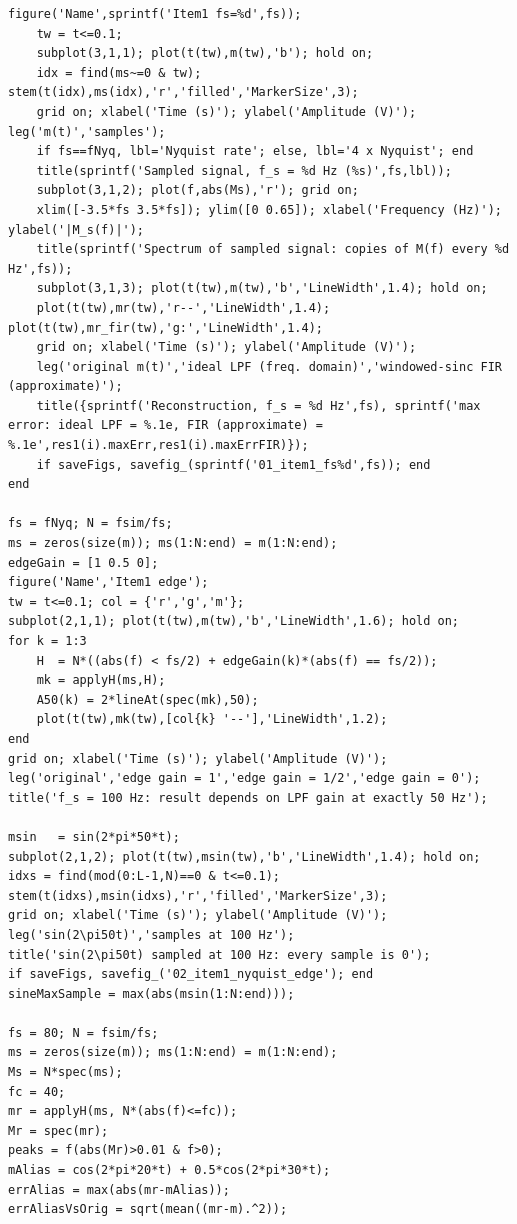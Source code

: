 \documentclass[a4paper]{article}
\begin{document}
\begin{lstlisting}[basicstyle=\ttfamily\scriptsize, breaklines=true, breakatwhitespace=true, frame=single, xleftmargin=6pt, xrightmargin=6pt, framexleftmargin=6pt, framexrightmargin=6pt, aboveskip=4pt, belowskip=6pt]
    figure('Name',sprintf('Item1 fs=%d',fs));
    tw = t<=0.1;
    subplot(3,1,1); plot(t(tw),m(tw),'b'); hold on;
    idx = find(ms~=0 & tw); stem(t(idx),ms(idx),'r','filled','MarkerSize',3);
    grid on; xlabel('Time (s)'); ylabel('Amplitude (V)'); leg('m(t)','samples');
    if fs==fNyq, lbl='Nyquist rate'; else, lbl='4 x Nyquist'; end
    title(sprintf('Sampled signal, f_s = %d Hz (%s)',fs,lbl));
    subplot(3,1,2); plot(f,abs(Ms),'r'); grid on;
    xlim([-3.5*fs 3.5*fs]); ylim([0 0.65]); xlabel('Frequency (Hz)'); ylabel('|M_s(f)|');
    title(sprintf('Spectrum of sampled signal: copies of M(f) every %d Hz',fs));
    subplot(3,1,3); plot(t(tw),m(tw),'b','LineWidth',1.4); hold on;
    plot(t(tw),mr(tw),'r--','LineWidth',1.4); plot(t(tw),mr_fir(tw),'g:','LineWidth',1.4);
    grid on; xlabel('Time (s)'); ylabel('Amplitude (V)');
    leg('original m(t)','ideal LPF (freq. domain)','windowed-sinc FIR (approximate)');
    title({sprintf('Reconstruction, f_s = %d Hz',fs), sprintf('max error: ideal LPF = %.1e, FIR (approximate) = %.1e',res1(i).maxErr,res1(i).maxErrFIR)});
    if saveFigs, savefig_(sprintf('01_item1_fs%d',fs)); end
end

fs = fNyq; N = fsim/fs;
ms = zeros(size(m)); ms(1:N:end) = m(1:N:end);
edgeGain = [1 0.5 0];
figure('Name','Item1 edge');
tw = t<=0.1; col = {'r','g','m'};
subplot(2,1,1); plot(t(tw),m(tw),'b','LineWidth',1.6); hold on;
for k = 1:3
    H  = N*((abs(f) < fs/2) + edgeGain(k)*(abs(f) == fs/2));
    mk = applyH(ms,H);
    A50(k) = 2*lineAt(spec(mk),50);
    plot(t(tw),mk(tw),[col{k} '--'],'LineWidth',1.2);
end
grid on; xlabel('Time (s)'); ylabel('Amplitude (V)');
leg('original','edge gain = 1','edge gain = 1/2','edge gain = 0');
title('f_s = 100 Hz: result depends on LPF gain at exactly 50 Hz');

msin   = sin(2*pi*50*t);
subplot(2,1,2); plot(t(tw),msin(tw),'b','LineWidth',1.4); hold on;
idxs = find(mod(0:L-1,N)==0 & t<=0.1);
stem(t(idxs),msin(idxs),'r','filled','MarkerSize',3);
grid on; xlabel('Time (s)'); ylabel('Amplitude (V)');
leg('sin(2\pi50t)','samples at 100 Hz');
title('sin(2\pi50t) sampled at 100 Hz: every sample is 0');
if saveFigs, savefig_('02_item1_nyquist_edge'); end
sineMaxSample = max(abs(msin(1:N:end)));

fs = 80; N = fsim/fs;
ms = zeros(size(m)); ms(1:N:end) = m(1:N:end);
Ms = N*spec(ms);
fc = 40;
mr = applyH(ms, N*(abs(f)<=fc));
Mr = spec(mr);
peaks = f(abs(Mr)>0.01 & f>0);
mAlias = cos(2*pi*20*t) + 0.5*cos(2*pi*30*t);
errAlias = max(abs(mr-mAlias));
errAliasVsOrig = sqrt(mean((mr-m).^2));


\end{lstlisting}
\end{document}
